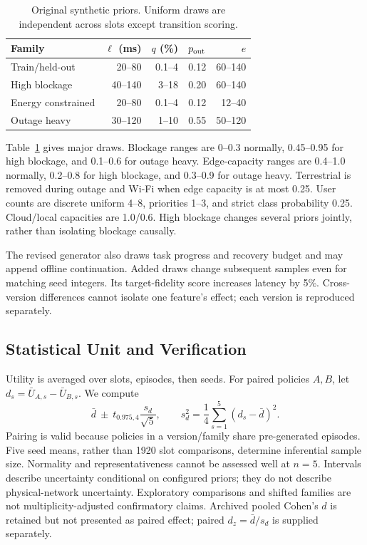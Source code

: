 \documentclass[letterpaper,journal]{IEEEtran}
\begin{document}
\begin{table}[t]
\caption{Original synthetic priors. Uniform draws are independent across slots except transition scoring.}\label{tab:families}
\centering\footnotesize
\begin{tabular}{lrrrr}
\toprule Family & $\ell$ (ms) & $q$ (\%) & $p_{\rm out}$ & $e$ \\
\midrule
Train/held-out & 20--80 & 0.1--4 & 0.12 & 60--140 \\
High blockage & 40--140 & 3--18 & 0.20 & 60--140 \\
Energy constrained & 20--80 & 0.1--4 & 0.12 & 12--40 \\
Outage heavy & 30--120 & 1--10 & 0.55 & 50--120 \\
\bottomrule\end{tabular}
\end{table}

Table~\ref{tab:families} gives major draws. Blockage ranges are 0--0.3 normally, 0.45--0.95 for high blockage, and 0.1--0.6 for outage heavy. Edge-capacity ranges are 0.4--1.0 normally, 0.2--0.8 for high blockage, and 0.3--0.9 for outage heavy. Terrestrial is removed during outage and Wi-Fi when edge capacity is at most 0.25. User counts are discrete uniform 4--8, priorities 1--3, and strict class probability 0.25. Cloud/local capacities are 1.0/0.6. High blockage changes several priors jointly, rather than isolating blockage causally.

The revised generator also draws task progress and recovery budget and may append offline continuation. Added draws change subsequent samples even for matching seed integers. Its target-fidelity score increases latency by 5\%. Cross-version differences cannot isolate one feature's effect; each version is reproduced separately.

\subsection{Statistical Unit and Verification}
Utility is averaged over slots, episodes, then seeds. For paired policies $A,B$, let $d_s=\bar U_{A,s}-\bar U_{B,s}$. We compute
\begin{equation}
\bar d\ \pm\ t_{0.975,4}\frac{s_d}{\sqrt5},\qquad
s_d^2=\frac{1}{4}\sum_{s=1}^5(d_s-\bar d)^2.\label{eq:ci}
\end{equation}
Pairing is valid because policies in a version/family share pre-generated episodes. Five seed means, rather than 1920 slot comparisons, determine inferential sample size. Normality and representativeness cannot be assessed well at $n=5$. Intervals describe uncertainty conditional on configured priors; they do not describe physical-network uncertainty. Exploratory comparisons and shifted families are not multiplicity-adjusted confirmatory claims. Archived pooled Cohen's $d$ is retained but not presented as paired effect; paired $d_z=\bar d/s_d$ is supplied separately.
\end{document}
